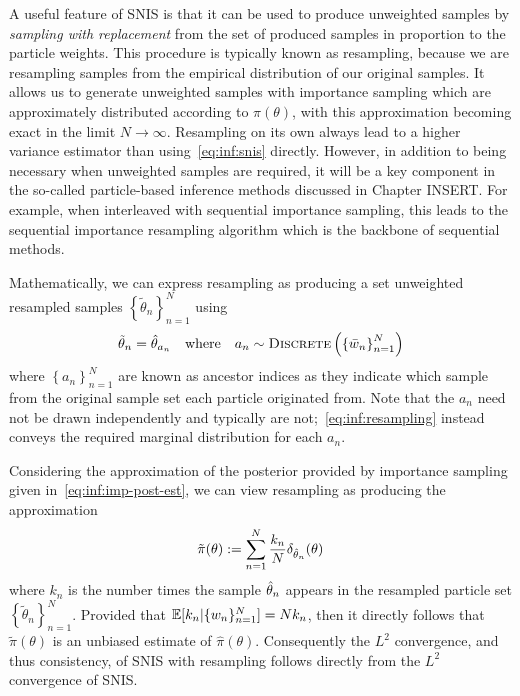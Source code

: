 A useful feature of SNIS is that it can be used to produce unweighted samples
by \emph{sampling with replacement} from the set of produced samples in proportion
to the particle weights.  This procedure is typically known as resampling, because we
are resampling samples from the empirical distribution of our original samples.
It allows us to generate unweighted samples with importance sampling which are
approximately distributed according to $\pi(\theta)$, with this approximation becoming
exact in the limit $N\rightarrow\infty$.  
Resampling on its own always lead to a higher variance estimator than using~\eqref{eq:inf:snis}
directly.   However, in addition to  being necessary when unweighted samples are required,
it will be a key component in the so-called particle-based inference methods discussed
in Chapter INSERT.  For example, when interleaved with sequential importance sampling,
this leads to the sequential importance resampling algorithm which is the backbone of 
sequential \mc methods.

Mathematically, we can express resampling as producing a set unweighted resampled
samples $\left\{\tilde{\theta}_n\right\}_{n=1}^N$ using
\begin{align}
\label{eq:inf:resampling}
\tilde{\theta}_n = \hat{\theta}_{a_n} \quad \mathrm{where} \quad
a_n \sim \textsc{Discrete}\left(\left\{\bar{w}_n\right\}_{n=1}^N\right)
\end{align}
where $\left\{a_n\right\}_{n=1}^N$ are known as ancestor indices as they indicate which sample
from the original sample set each particle originated from.  Note that the $a_n$ need
not be drawn independently and typically are not;~\eqref{eq:inf:resampling} instead conveys
the required marginal distribution for each $a_n$.  

Considering the approximation of the
posterior provided by importance sampling given in~\eqref{eq:inf:imp-post-est}, we can view
resampling as producing the approximation
\begin{align}
\label{eq:inf:resampling-post}
\tilde{\pi}(\theta) := \sum_{n=1}^{N} \frac{k_n}{N} \delta_{\hat{\theta}_n} (\theta)
\end{align}
where $k_n$ is the number times the sample $\hat{\theta}_n$ appears in the resampled particle
set $\left\{\tilde{\theta}_n\right\}_{n=1}^N$.  Provided that $\mathbb{E}[k_n | \{w_n\}_{n=1}^N] = Nk_n$,
then it directly follows that $\tilde{\pi}(\theta)$ is an unbiased estimate of $\hat{\pi}(\theta)$.
Consequently the $L^2$ convergence, and thus consistency, of SNIS with resampling follows
directly from the $L^2$ convergence of SNIS.
	
